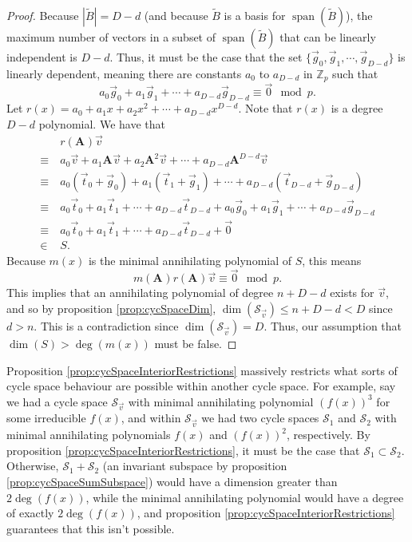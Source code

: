 \documentclass[a4paper, 12pt, reqno]{amsart}
\DeclareMathOperator{\Span}{span}
\newcommand{\Z}{\mathbb{Z}}
\newcommand\Mat[2][]{\mathbf{#1}^{\!#2}}
\newcommand{\cycsp}[1]{\mathcal{S}_{#1}}
\begin{document}
\begin{proof}
		Because $|\tilde{B}| = D-d$ (and because $\tilde{B}$ is a basis for $\Span(\tilde{B})$), the maximum number of vectors in a subset of $\Span(\tilde{B})$ that can be 
		linearly independent is $D-d$. Thus, it must be the case that the set $\{\vec{g}_0, \vec{g}_1, \cdots, \vec{g}_{D-d}\}$ is linearly dependent, meaning there are
		constants $a_0$ to $a_{D-d}$ in $\Z_p$ such that
		\[
			a_0\vec{g}_0 + a_1\vec{g}_1 + \cdots + a_{D-d}\vec{g}_{D-d} \equiv \vec{0} \mod{p}.
		\]
		Let $r(x) = a_0 + a_1x + a_2x^2 + \cdots + a_{D-d}x^{D-d}$. Note that $r(x)$ is a degree $D-d$ polynomial. We have that
		\begin{align*}
			       & \ r(\Mat[A]{})\vec{v} \\
			\equiv & \ a_0\vec{v} + a_1\Mat[A]{}\vec{v} + a_2\Mat[A]{2}\vec{v} + \cdots + a_{D-d}\Mat[A]{D-d}\vec{v} \\
			\equiv & \ a_0(\vec{t}_0 + \vec{g}_0) + a_1(\vec{t}_1 + \vec{g}_1) + \cdots + a_{D-d}(\vec{t}_{D-d} + \vec{g}_{D-d}) \\
			\equiv & \ a_0\vec{t}_0 + a_1\vec{t}_1 + \cdots + a_{D-d}\vec{t}_{D-d} + a_0\vec{g}_0 + a_1\vec{g}_1 + \cdots + a_{D-d}\vec{g}_{D-d} \\
			\equiv & \ a_0\vec{t}_0 + a_1\vec{t}_1 + \cdots + a_{D-d}\vec{t}_{D-d} + \vec{0} \\
			\in    & \ S.
		\end{align*}
		Because $m(x)$ is the minimal annihilating polynomial of $S$, this means
		\[
			m(\Mat[A]{})r(\Mat[A]{})\vec{v} \equiv \vec{0} \mod{p}.
		\]
		This implies that an annihilating polynomial of degree $n + D - d$ exists for $\vec{v}$, and so by proposition \ref{prop:cycSpaceDim}, 
		$\dim(\cycsp{\vec{v}}) \leq n + D - d < D$ since $d > n$. This is a contradiction since $\dim(\cycsp{\vec{v}}) = D$. Thus, our assumption that 
		$\dim(S) > \deg(m(x))$ must be false.
	\end{proof}
	
	Proposition \ref{prop:cycSpaceInteriorRestrictions} massively restricts what sorts of cycle space behaviour are possible within another cycle space. For example, say we had
	a cycle space $\cycsp{\vec{v}}$ with minimal annihilating polynomial $(f(x))^3$ for some irreducible $f(x)$, and within $\cycsp{\vec{v}}$ we had two cycle spaces 
	$\cycsp{1}$ and $\cycsp{2}$ with minimal annihilating polynomials $f(x)$ and $(f(x))^2$, respectively. By proposition \ref{prop:cycSpaceInteriorRestrictions}, it must be 
	the case that $\cycsp{1} \subset \cycsp{2}$. Otherwise, $\cycsp{1} + \cycsp{2}$ (an invariant subspace by proposition \ref{prop:cycSpaceSumSubspace}) would have a 
	dimension greater than $2\deg(f(x))$, while the minimal annihilating polynomial would have a degree of exactly $2\deg(f(x))$, and proposition 
	\ref{prop:cycSpaceInteriorRestrictions} guarantees that this isn't possible.
	
\end{document}
